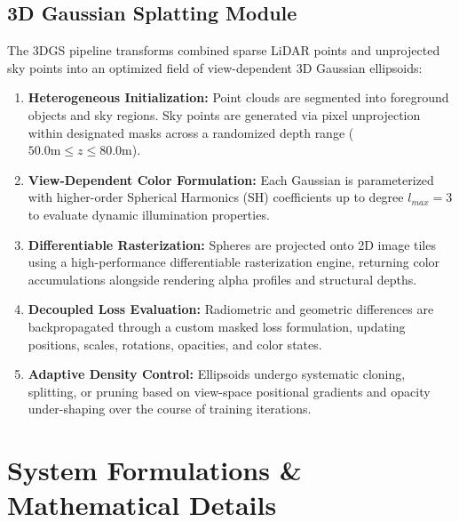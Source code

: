 \documentclass{article}
\begin{document}
\subsection{3D Gaussian Splatting Module}
The 3DGS pipeline transforms combined sparse LiDAR points and unprojected sky points into an optimized field of view-dependent 3D Gaussian ellipsoids:
\begin{enumerate}
    \item \textbf{Heterogeneous Initialization:} Point clouds are segmented into foreground objects and sky regions. Sky points are generated via pixel unprojection within designated masks across a randomized depth range ($50.0\text{m} \le z \le 80.0\text{m}$).
    \item \textbf{View-Dependent Color Formulation:} Each Gaussian is parameterized with higher-order Spherical Harmonics (SH) coefficients up to degree $l_{max}=3$ to evaluate dynamic illumination properties.
    \item \textbf{Differentiable Rasterization:} Spheres are projected onto 2D image tiles using a high-performance differentiable rasterization engine, returning color accumulations alongside rendering alpha profiles and structural depths.
    \item \textbf{Decoupled Loss Evaluation:} Radiometric and geometric differences are backpropagated through a custom masked loss formulation, updating positions, scales, rotations, opacities, and color states.
    \item \textbf{Adaptive Density Control:} Ellipsoids undergo systematic cloning, splitting, or pruning based on view-space positional gradients and opacity under-shaping over the course of training iterations.
\end{enumerate}

\section{System Formulations \& Mathematical Details}
\end{document}
